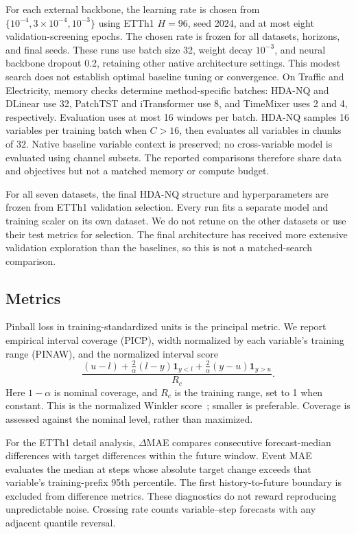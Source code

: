 For each external backbone, the learning rate is chosen from $\{10^{-4},3\times10^{-4},10^{-3}\}$ using ETTh1 $H=96$, seed 2024, and at most eight validation-screening epochs. The chosen rate is frozen for all datasets, horizons, and final seeds. These runs use batch size 32, weight decay $10^{-3}$, and neural backbone dropout 0.2, retaining other native architecture settings. This modest search does not establish optimal baseline tuning or convergence. On Traffic and Electricity, memory checks determine method-specific batches: HDA-NQ and DLinear use 32, PatchTST and iTransformer use 8, and TimeMixer uses 2 and 4, respectively. Evaluation uses at most 16 windows per batch. HDA-NQ samples 16 variables per training batch when $C>16$, then evaluates all variables in chunks of 32. Native baseline variable context is preserved; no cross-variable model is evaluated using channel subsets. The reported comparisons therefore share data and objectives but not a matched memory or compute budget.

For all seven datasets, the final HDA-NQ structure and hyperparameters are frozen from ETTh1 validation selection. Every run fits a separate model and training scaler on its own dataset. We do not retune on the other datasets or use their test metrics for selection. The final architecture has received more extensive validation exploration than the baselines, so this is not a matched-search comparison.

\subsection{Metrics}
Pinball loss in training-standardized units is the principal metric. We report empirical interval coverage (PICP), width normalized by each variable's training range (PINAW), and the normalized interval score
\begin{equation}
 \frac{(u-l)+\frac{2}{\alpha}(l-y)\mathbf1_{y<l}
                   +\frac{2}{\alpha}(y-u)\mathbf1_{y>u}}{R_c}.
\end{equation}
Here $1-\alpha$ is nominal coverage, and $R_c$ is the training range, set to 1 when constant. This is the normalized Winkler score~\cite{winkler1972decision}; smaller is preferable. Coverage is assessed against the nominal level, rather than maximized.

For the ETTh1 detail analysis, $\Delta$MAE compares consecutive forecast-median differences with target differences within the future window. Event MAE evaluates the median at steps whose absolute target change exceeds that variable's training-prefix 95th percentile. The first history-to-future boundary is excluded from difference metrics. These diagnostics do not reward reproducing unpredictable noise. Crossing rate counts variable--step forecasts with any adjacent quantile reversal.

